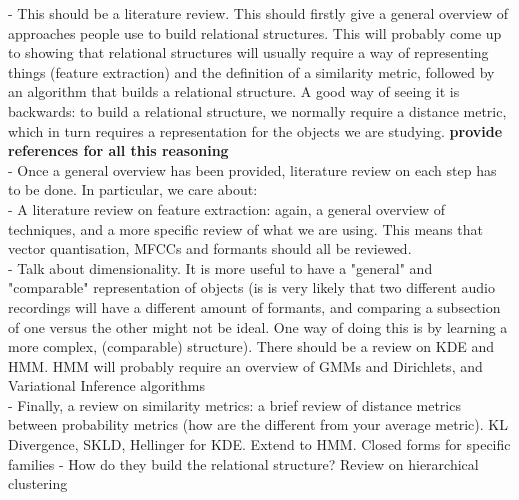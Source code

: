 \documentclass[../main.tex]{subfiles}
\begin{document}
- This should be a literature review. This should firstly give a general overview of approaches people use to build relational structures. This will probably come up to showing that relational structures will usually require a way of representing things (feature extraction) and the definition of a similarity metric, followed by an algorithm that builds a relational structure. A good way of seeing it is backwards: to build a relational structure, we normally require a distance metric, which in turn requires a representation for the objects we are studying. \textbf{provide references for all this reasoning}\\
- Once a general overview has been provided, literature review on each step has to be done. In particular, we care about:\\
- A literature review on feature extraction: again, a general overview of techniques, and a more specific review of what we are using. This means that vector quantisation, MFCCs and formants should all be reviewed.\\
- Talk about dimensionality. It is more useful to have a "general" and "comparable" representation of objects (is is very likely that two different audio recordings will have a different amount of formants, and comparing a subsection of one versus the other might not be ideal. One way of doing this is by learning a more complex, (comparable) structure). There should be a review on KDE and HMM. HMM will probably require an overview of GMMs and Dirichlets, and Variational Inference algorithms\\
- Finally, a review on similarity metrics: a brief review of distance metrics between probability metrics (how are the different from your average metric). KL Divergence, SKLD, Hellinger for KDE. Extend to HMM. Closed forms for specific families
- How do they build the relational structure? Review on hierarchical clustering
\end{document}
